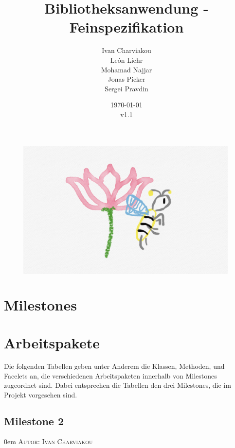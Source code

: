 \documentclass{article}
\title{Bibliotheksanwendung - Feinspezifikation}
\date{\today\\v1.1}
\author{
	Ivan Charviakou\\
	León Liehr\\
	Mohamad Najjar\\
	Jonas Picker\\
	Sergei Pravdin
}
\makeatletter
\newcommand{\sectionauthor}[1]{
	{\parindent 0em \large \scshape Autor: #1 \par \nobreak \vspace*{1em}}
	\@afterheading
}
\makeatother
\begin{document}
\maketitle
\begin{figure}[H]
	\centering
	\includegraphics[width = 30em]{Logo}
\end{figure}
\newpage
\tableofcontents
\newpage


\section{Milestones}


\section{Arbeitspakete}

Die folgenden Tabellen geben unter Anderem die Klassen, Methoden, und Facelets an, die verschiedenen Arbeitspaketen innerhalb von Milestones zugeordnet sind. 
Dabei entsprechen die Tabellen den drei Milestones, die im Projekt vorgesehen sind.

\subsection{Milestone 2}
\sectionauthor{Ivan Charviakou}
\end{document}
